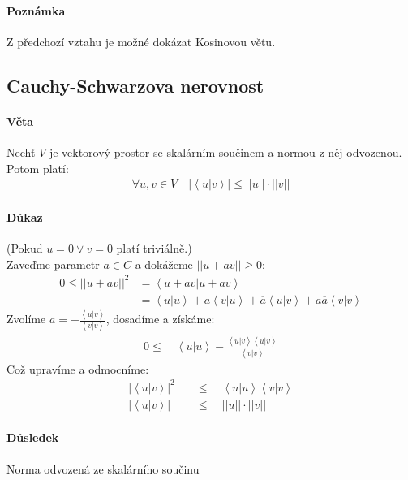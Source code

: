 \documentclass[a4paper,10pt]{article}
\begin{document}
\paragraph{Poznámka}
Z předchozí vztahu je možné dokázat Kosinovou větu.

\subsection{Cauchy-Schwarzova nerovnost}
\setcounter{equation}{0}
\paragraph{Věta}
Nechť $V$ je vektorový prostor se skalárním součinem a normou z něj odvozenou.
Potom platí:
\begin{align*}
	\forall u,v \in V \quad |\left<u|v\right>| \le ||u|| \cdot ||v||
\end{align*}
\paragraph{Důkaz}
(Pokud $u = 0 \lor v = 0$ platí triviálně.) \\
Zaveďme parametr $a \in C$ a dokážeme $||u + av|| \ge 0$:
\begin{align}
	0 \le ||u+av||^2 &= \left<u + av|u+av\right> \\
	&= \left<u|u\right> + a\left<v|u\right> + \overline{a}\left<u|v\right> +
	a\overline{a}\left<v|v\right>
\end{align}
Zvolíme $a = - \frac{\left<u|v\right>}{\left<v|v\right>}$, dosadíme a získáme:
\begin{align}
	0 \le  \quad \left<u|u\right> - \frac{\overline{\left<u|v\right>}\left<u|v\right>}{\left<v|v\right>}
\end{align}
Což upravíme a odmocníme:
\begin{align}
	|\left<u|v\right>|^2  \quad &\le  \quad \left<u|u\right>\left<v|v\right> \\
	|\left<u|v\right>| \quad  &\le \quad ||u|| \cdot ||v||
\end{align}

\paragraph{Důsledek}
Norma odvozená ze skalárního součinu
\end{document}

